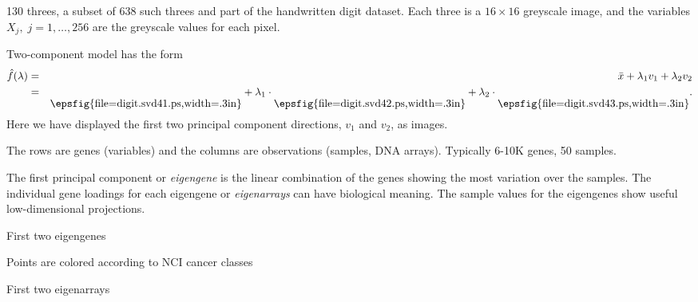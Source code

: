 \documentclass{seminar}
\begin{document}
\begin{slide*}
130 threes, a subset of 638 such threes and part of the handwritten digit dataset.
Each three is a $16\times 16$ greyscale image, and the variables $X_j,\;j=1,\ldots,256$ are the greyscale values for each pixel.
\end{slide*}
\begin{slide*}
    \centerline{}

Two-component model has the form
\begin{eqnarray*}
  \hat{f}(\lambda)&=&\bar{x} + \lambda_1v_1 +\lambda_2v_2\\
  &=&\raisebox{-.15in}{\epsfig{file=digit.svd41.ps,width=.3in}}+\lambda_1\cdot
  \raisebox{-.15in}{\epsfig{file=digit.svd42.ps,width=.3in}}+\lambda_2\cdot \raisebox{-.15in}{\epsfig{file=digit.svd43.ps,width=.3in}}.
\end{eqnarray*}
Here we have displayed the first two principal component directions,
$v_1$ and $v_2$, as images.
\end{slide*}
\begin{slide*}
The rows are genes (variables) and the columns are observations
(samples, DNA arrays). Typically 6-10K genes, 50 samples.

\bigskip

\centerline{}
\end{slide*}
\begin{slide*}
  \begin{itemize}
  \bitem The first principal component or {\em eigengene} is the linear
    combination of the genes showing the most variation over the
    samples.
  \bitem The individual gene loadings for each eigengene  or {\em
    eigenarrays} can have
    biological meaning.
  \bitem The sample values for the eigengenes show useful
    low-dimensional projections.
  \end{itemize}
\end{slide*}
\begin{slide*}
{\small
\centerline{\blue First two eigengenes}
{\scriptsize Points are colored according to NCI cancer classes}

\centerline{}
\centerline{\blue First two eigenarrays}
\centerline{}
}
\end{slide*}
\end{document}

